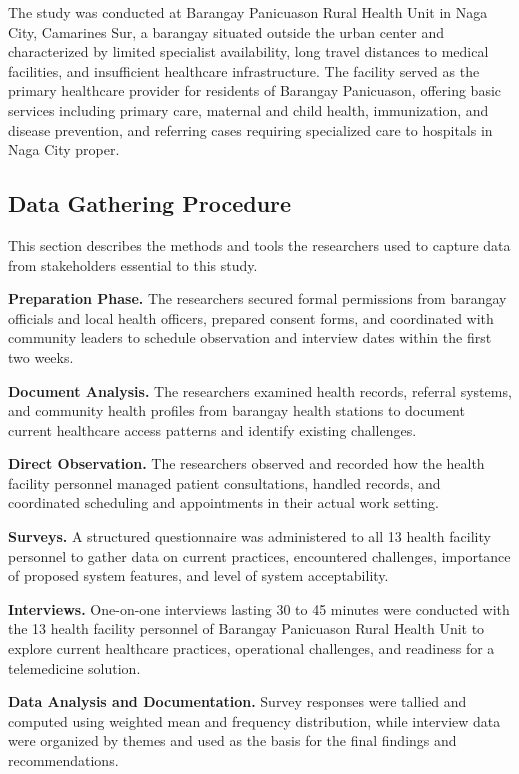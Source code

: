 \documentclass{research}
\begin{document}
 The study was conducted at Barangay Panicuason Rural Health Unit in Naga City, Camarines Sur, a barangay situated outside the urban center and characterized
by limited specialist availability, long travel distances to medical facilities, and insuﬀicient healthcare infrastructure. The facility served as the primary healthcare provider for residents of Barangay Panicuason, offering basic services including primary care, maternal and child health, immunization, and disease prevention, and referring cases requiring specialized care to hospitals in Naga City proper.

\subsection{Data Gathering Procedure}

\indent This section describes the methods and tools the researchers used to capture 
data from stakeholders essential to this study.

\indent \textbf{Preparation Phase.} The researchers secured formal permissions from 
barangay officials and local health officers, prepared consent forms, and coordinated 
with community leaders to schedule observation and interview dates within the first 
two weeks.

\indent \textbf{Document Analysis.} The researchers examined health records, referral 
systems, and community health profiles from barangay health stations to document current 
healthcare access patterns and identify existing challenges.

\indent \textbf{Direct Observation.} The researchers observed and recorded how the 
health facility personnel managed patient consultations, handled records, and coordinated 
scheduling and appointments in their actual work setting.

 \textbf{Surveys.} A structured questionnaire was administered to all 13 health 
facility personnel to gather data on current practices, encountered challenges, importance 
of proposed system features, and level of system acceptability.

 \textbf{Interviews.} One-on-one interviews lasting 30 to 45 minutes were 
conducted with the 13 health facility personnel of Barangay Panicuason Rural Health Unit 
to explore current healthcare practices, operational challenges, and readiness for a 
telemedicine solution.

 \textbf{Data Analysis and Documentation.} Survey responses were tallied and 
computed using weighted mean and frequency distribution, while interview data were 
organized by themes and used as the basis for the final findings and recommendations.
\end{document}
